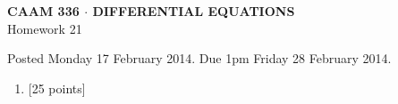\documentclass[10pt]{article}
\begin{document}
\vspace*{-5em}
\begin{center}
\large \textsf{\textbf{CAAM 336 $\cdot$ DIFFERENTIAL EQUATIONS}\\[0.5em]
Homework 21 }
\end{center}

Posted Monday 17 February 2014.  Due 1pm Friday 28 February 2014.

\begin{enumerate}\addtocounter{enumi}{20}
\item {[25 points]}  
\end{enumerate}
\end{document}
